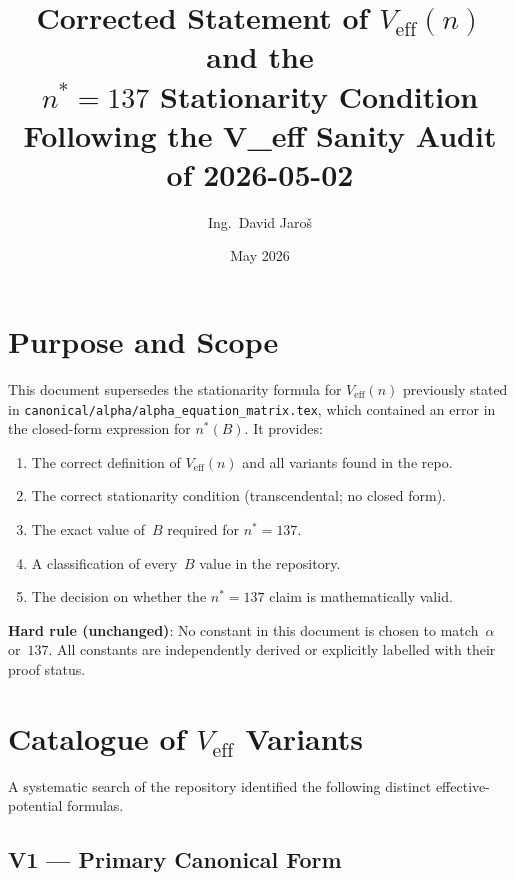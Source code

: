 \documentclass[12pt,a4paper]{article}
\title{\textbf{Corrected Statement of $V_{\mathrm{eff}}(n)$ and the\\
         $n^* = 137$ Stationarity Condition}\\
         \large Following the V\_eff Sanity Audit of 2026-05-02}
\author{Ing.\ David Jaro\v{s}}
\date{May 2026}
\theoremstyle{definition}
\theoremstyle{remark}
\begin{document}
  \maketitle
\fi

\section{Purpose and Scope}
\label{sec:vc:purpose}

This document supersedes the stationarity formula for $V_{\mathrm{eff}}(n)$
previously stated in \texttt{canonical/alpha/alpha\_equation\_matrix.tex},
which contained an error in the closed-form expression for $n^*(B)$.
It provides:

\begin{enumerate}
  \item The correct definition of $V_{\mathrm{eff}}(n)$ and all variants found in the repo.
  \item The correct stationarity condition (transcendental; no closed form).
  \item The exact value of~$B$ required for $n^* = 137$.
  \item A classification of every~$B$ value in the repository.
  \item The decision on whether the $n^* = 137$ claim is mathematically valid.
\end{enumerate}

\begin{warnbox}
\textbf{Hard rule (unchanged)}: No constant in this document is chosen to
match~$\alpha$ or~$137$.  All constants are independently derived or explicitly
labelled with their proof status.
\end{warnbox}

\section{Catalogue of $V_{\mathrm{eff}}$ Variants}
\label{sec:vc:variants}

A systematic search of the repository identified the following distinct
effective-potential formulas.

\subsection{V1 — Primary Canonical Form}
\label{sec:vc:V1}
\end{document}
